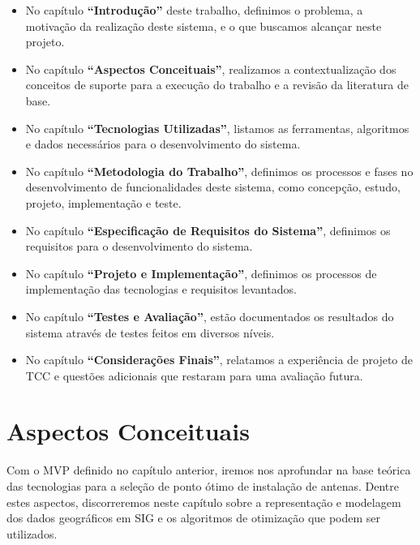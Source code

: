 \documentclass[]{politex}
\begin{document}
\begin{itemize}
\item No capítulo \textbf{``Introdução''} deste trabalho, definimos o problema, a motivação
da realização deste sistema, e o que buscamos alcançar neste projeto.

\item No capítulo \textbf{``Aspectos Conceituais''}, realizamos a
contextualização dos conceitos de suporte para a execução do trabalho e a
revisão da literatura de base.

\item No capítulo \textbf{``Tecnologias Utilizadas''}, listamos as ferramentas,
algoritmos e dados necessários para o desenvolvimento do sistema.

\item No capítulo \textbf{``Metodologia do Trabalho''}, definimos os processos e
fases no desenvolvimento de funcionalidades deste sistema, como concepção,
estudo, projeto, implementação e teste.

\item No capítulo \textbf{``Especificação de Requisitos do Sistema''}, definimos
os requisitos para o desenvolvimento do sistema.

\item No capítulo \textbf{``Projeto e Implementação''}, definimos os processos
de implementação das tecnologias e requisitos levantados.

\item No capítulo \textbf{``Testes e Avaliação''}, estão documentados os
resultados do sistema através de testes feitos em diversos níveis.

\item No capítulo \textbf{``Considerações Finais''}, relatamos a experiência de
projeto de TCC e questões adicionais que restaram para uma avaliação futura.

\end{itemize}

\chapter{Aspectos Conceituais}

Com o MVP definido no capítulo anterior, iremos nos aprofundar na base teórica
das tecnologias para a seleção de ponto ótimo de instalação de antenas. Dentre
estes aspectos, discorreremos neste capítulo sobre a representação e modelagem
dos dados geográficos em SIG e os algoritmos de otimização que podem ser
utilizados.
\end{document}
